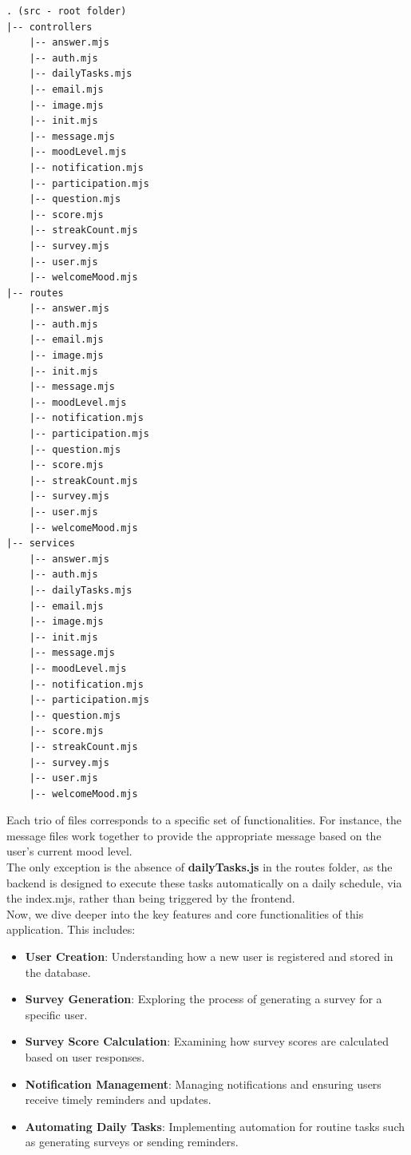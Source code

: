 \begin{lstlisting}[caption=Routes - Controllers - Services Folder Structure]
. (src - root folder)
|-- controllers
    |-- answer.mjs
    |-- auth.mjs
    |-- dailyTasks.mjs
    |-- email.mjs
    |-- image.mjs
    |-- init.mjs
    |-- message.mjs
    |-- moodLevel.mjs
    |-- notification.mjs
    |-- participation.mjs
    |-- question.mjs
    |-- score.mjs
    |-- streakCount.mjs
    |-- survey.mjs
    |-- user.mjs
    |-- welcomeMood.mjs
|-- routes
    |-- answer.mjs
    |-- auth.mjs
    |-- email.mjs
    |-- image.mjs
    |-- init.mjs
    |-- message.mjs
    |-- moodLevel.mjs
    |-- notification.mjs
    |-- participation.mjs
    |-- question.mjs
    |-- score.mjs
    |-- streakCount.mjs
    |-- survey.mjs
    |-- user.mjs
    |-- welcomeMood.mjs
|-- services
    |-- answer.mjs
    |-- auth.mjs
    |-- dailyTasks.mjs
    |-- email.mjs
    |-- image.mjs
    |-- init.mjs
    |-- message.mjs
    |-- moodLevel.mjs
    |-- notification.mjs
    |-- participation.mjs
    |-- question.mjs
    |-- score.mjs
    |-- streakCount.mjs
    |-- survey.mjs
    |-- user.mjs
    |-- welcomeMood.mjs
\end{lstlisting}

\vspace{5mm}

\noindent Each trio of files corresponds to a specific set of functionalities. For instance, the message files work together to provide the appropriate message based on the user's current mood level.\vspace{5mm} \\
The only exception is the absence of \textbf{dailyTasks.js} in the routes folder, as the backend is designed to execute these tasks automatically on a daily schedule, via the index.mjs, rather than being triggered by the frontend.\vspace{10mm} \\
Now, we dive deeper into the key features and core functionalities of this application. This includes:

\begin{itemize}
    \item \textbf{User Creation}: Understanding how a new user is registered and stored in the database.
    \item \textbf{Survey Generation}: Exploring the process of generating a survey for a specific user.
    \item \textbf{Survey Score Calculation}: Examining how survey scores are calculated based on user responses.
    \item \textbf{Notification Management}: Managing notifications and ensuring users receive timely reminders and updates.
    \item \textbf{Automating Daily Tasks}: Implementing automation for routine tasks such as generating surveys or sending reminders.
\end{itemize}

